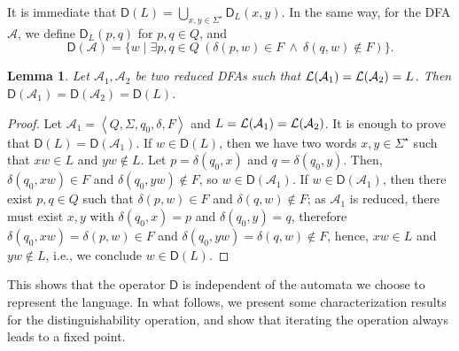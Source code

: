 \documentclass{article}
\newtheorem{lemma}{Lemma}
\newcommand{\dfa}{DFA\xspace}
\newcommand{\dfas}{DFAs\xspace}
\newcommand{\disw}[2]{\mathsf{D}_{#1}(#2)}
\newcommand{\dis}[1]{\mathsf{D}(#1)}
\newcommand{\diso}{\mathsf{D}}
\newcommand{\tuple}[1]{\left\langle #1\right\rangle}
\newcommand{\lang}[1]{{\cal L}(#1)}
\begin{document}
It is immediate that $\dis{L}=\displaystyle\bigcup_{x,y\in
  \Sigma^\star} \disw{L}{x,y}$.
In the same way, for the \dfa $\mathcal{A}$, we define $\disw{L}{p,q}$
for $p,q\in Q$, and 
\begin{equation}
\label{edisdefA}
\dis{\mathcal{A}}=\{w\mid \exists p,q\in Q \  (\delta(p,w)\in F\ \wedge \ 
                          \delta(q,w)\notin F) \}.
\end{equation}

\begin{lemma}
 Let $\mathcal{A}_1,\mathcal{A}_2$ be two reduced \dfas such that 
$\lang{\mathcal{A}_1}=\lang{\mathcal{A}_2}=L$. 
Then $\dis{\mathcal{A}_1}=\dis{\mathcal{A}_2}=\dis{L}$.
\end{lemma}
\begin{proof}
Let $\mathcal{A}_1=\tuple{Q,\Sigma, q_0,\delta,F}$ and
$L=\lang{\mathcal{A}_1}=\lang{\mathcal{A}_2}$.  
It is enough to prove that $\dis{L}=\dis{\mathcal{A}_1}$.
If $w\in \dis{L}$, then we have two words $x,y\in \Sigma^\star$ such that
$xw\in L$ and $yw\notin L$. 
Let $p=\delta(q_0,x)$ and $q=\delta(q_0,y)$. 
Then, $\delta(q_0,xw)\in F$ and $\delta(q_0,yw)\notin F$, so $w\in
\dis{\mathcal{A}_1}$. 
If  $w\in \dis{\mathcal{A}_1}$, then there exist $p, q\in Q$ such that 
$\delta(p,w)\in F$ and  $\delta(q,w)\notin F$; as $\mathcal{A}_1$ is reduced, 
there must exist $x,y$ with $\delta(q_0,x)=p$ and $\delta(q_0,y)=q $, 
therefore $\delta(q_0,xw)= \delta(p,w)\in F$ and $\delta(q_0,yw)=\delta(q,w)\notin F$,
 hence, $xw\in L$ and $yw\notin L$, i.e., we conclude $w\in \dis{L}$.
\end{proof}

This shows that the operator $\diso$ is independent of the automata
we choose to represent the language. In what follows, we present some characterization results for the
distinguishability operation, and show that iterating the operation
always leads to a fixed point. 
\end{document}
